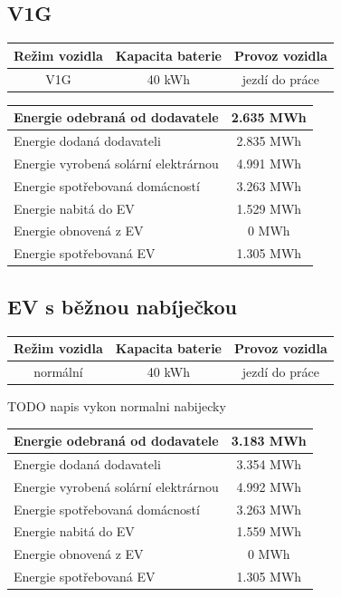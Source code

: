 \documentclass[12pt,a4paper]{article}
\begin{document}
\subsection{V1G}

\bigskip
\begin{tabular}{ | c | c | c | }
\hline
Režim vozidla & Kapacita baterie & Provoz vozidla \\
\hline
V1G & 40 kWh & jezdí do práce \\
\hline
\end{tabular}
\bigskip

\bigskip
\begin{tabular}{ | l | c | }
\hline
Energie odebraná od dodavatele & 2.635 MWh \\
\hline
Energie dodaná dodavateli & 2.835 MWh \\
\hline
Energie vyrobená solární elektrárnou & 4.991 MWh \\
\hline
Energie spotřebovaná domácností & 3.263 MWh \\
\hline
Energie nabitá do EV & 1.529 MWh \\
\hline
Energie obnovená z EV & 0 MWh \\
\hline
Energie spotřebovaná EV & 1.305 MWh \\
\hline
\end{tabular}
\bigskip


\subsection{EV s běžnou nabíječkou}

\bigskip
\begin{tabular}{ | c | c | c | }
\hline
Režim vozidla & Kapacita baterie & Provoz vozidla \\
\hline
normální & 40 kWh & jezdí do práce \\
\hline
\end{tabular}
\bigskip

TODO napis vykon normalni nabijecky

\bigskip
\begin{tabular}{ | l | c | }
\hline
Energie odebraná od dodavatele & 3.183 MWh \\
\hline
Energie dodaná dodavateli & 3.354 MWh \\
\hline
Energie vyrobená solární elektrárnou & 4.992 MWh \\
\hline
Energie spotřebovaná domácností & 3.263 MWh \\
\hline
Energie nabitá do EV & 1.559 MWh \\
\hline
Energie obnovená z EV & 0 MWh \\
\hline
Energie spotřebovaná EV & 1.305 MWh \\
\hline
\end{tabular}
\bigskip
\end{document}
